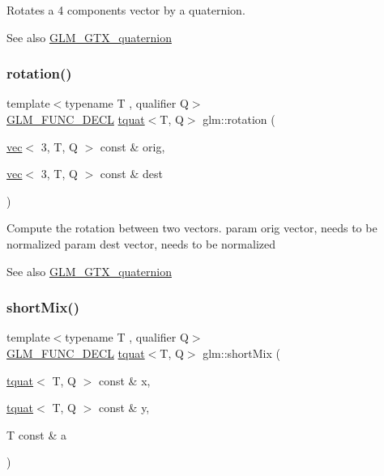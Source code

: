 Rotates a 4 components vector by a quaternion.

\begin{DoxySeeAlso}{See also}
\hyperlink{group__gtx__quaternion}{G\+L\+M\+\_\+\+G\+T\+X\+\_\+quaternion} 
\end{DoxySeeAlso}
\mbox{\label{group__gtx__quaternion_ga5a729f33cbd904c9ca14cdf25d0a07e4}} 
\subsubsection{\texorpdfstring{rotation()}{rotation()}}
{\footnotesize\ttfamily template$<$typename T , qualifier Q$>$ \\
\hyperlink{setup_8hpp_ab2d052de21a70539923e9bcbf6e83a51}{G\+L\+M\+\_\+\+F\+U\+N\+C\+\_\+\+D\+E\+CL} \hyperlink{structglm_1_1tquat}{tquat}$<$T, Q$>$ glm\+::rotation (\begin{DoxyParamCaption}\item[{\hyperlink{structglm_1_1vec}{vec}$<$ 3, T, Q $>$ const \&}]{orig,  }\item[{\hyperlink{structglm_1_1vec}{vec}$<$ 3, T, Q $>$ const \&}]{dest }\end{DoxyParamCaption})}

Compute the rotation between two vectors. param orig vector, needs to be normalized param dest vector, needs to be normalized

\begin{DoxySeeAlso}{See also}
\hyperlink{group__gtx__quaternion}{G\+L\+M\+\_\+\+G\+T\+X\+\_\+quaternion} 
\end{DoxySeeAlso}
\mbox{\label{group__gtx__quaternion_gaf0ad63ac791b1f9a587e363837c2d538}} 
\subsubsection{\texorpdfstring{short\+Mix()}{shortMix()}}
{\footnotesize\ttfamily template$<$typename T , qualifier Q$>$ \\
\hyperlink{setup_8hpp_ab2d052de21a70539923e9bcbf6e83a51}{G\+L\+M\+\_\+\+F\+U\+N\+C\+\_\+\+D\+E\+CL} \hyperlink{structglm_1_1tquat}{tquat}$<$T, Q$>$ glm\+::short\+Mix (\begin{DoxyParamCaption}\item[{\hyperlink{structglm_1_1tquat}{tquat}$<$ T, Q $>$ const \&}]{x,  }\item[{\hyperlink{structglm_1_1tquat}{tquat}$<$ T, Q $>$ const \&}]{y,  }\item[{T const \&}]{a }\end{DoxyParamCaption})}

